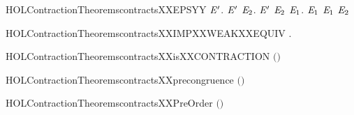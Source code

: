 \newcommand{\HOLContractionTheoremscontractsXXEPS}{\UseVerbatim{HOLContractionTheoremscontractsXXEPS}}
\begin{SaveVerbatim}{HOLContractionTheoremscontractsXXEPSYY}
\HOLTokenTurnstile{} \HOLSymConst{\HOLTokenForall{}} \ensuremath{\HOLBoundVar{E}\sp{\prime}}.
         \ensuremath{\HOLBoundVar{E}\sp{\prime}} \HOLSymConst{\HOLTokenImp{}}
       \HOLSymConst{\HOLTokenForall{}}\ensuremath{\HOLBoundVar{E}\sb{\mathrm{2}}}.  \ensuremath{\HOLBoundVar{E}\sp{\prime}} \ensuremath{\HOLBoundVar{E}\sb{\mathrm{2}}} \HOLSymConst{\HOLTokenImp{}} \HOLSymConst{\HOLTokenExists{}}\ensuremath{\HOLBoundVar{E}\sb{\mathrm{1}}}.   \ensuremath{\HOLBoundVar{E}\sb{\mathrm{1}}} \HOLSymConst{\HOLTokenConj{}}  \ensuremath{\HOLBoundVar{E}\sb{\mathrm{1}}} \ensuremath{\HOLBoundVar{E}\sb{\mathrm{2}}}
\end{SaveVerbatim}
\newcommand{\HOLContractionTheoremscontractsXXEPSYY}{\UseVerbatim{HOLContractionTheoremscontractsXXEPSYY}}
\begin{SaveVerbatim}{HOLContractionTheoremscontractsXXIMPXXWEAKXXEQUIV}
\HOLTokenTurnstile{} \HOLSymConst{\HOLTokenForall{}} .    \HOLSymConst{\HOLTokenImp{}}   
\end{SaveVerbatim}
\newcommand{\HOLContractionTheoremscontractsXXIMPXXWEAKXXEQUIV}{\UseVerbatim{HOLContractionTheoremscontractsXXIMPXXWEAKXXEQUIV}}
\begin{SaveVerbatim}{HOLContractionTheoremscontractsXXisXXCONTRACTION}
\HOLTokenTurnstile{}  \ensuremath{(}\ensuremath{)}
\end{SaveVerbatim}
\newcommand{\HOLContractionTheoremscontractsXXisXXCONTRACTION}{\UseVerbatim{HOLContractionTheoremscontractsXXisXXCONTRACTION}}
\begin{SaveVerbatim}{HOLContractionTheoremscontractsXXprecongruence}
\HOLTokenTurnstile{}  \ensuremath{(}\ensuremath{)}
\end{SaveVerbatim}
\newcommand{\HOLContractionTheoremscontractsXXprecongruence}{\UseVerbatim{HOLContractionTheoremscontractsXXprecongruence}}
\begin{SaveVerbatim}{HOLContractionTheoremscontractsXXPreOrder}
\HOLTokenTurnstile{}  \ensuremath{(}\ensuremath{)}
\end{SaveVerbatim}
